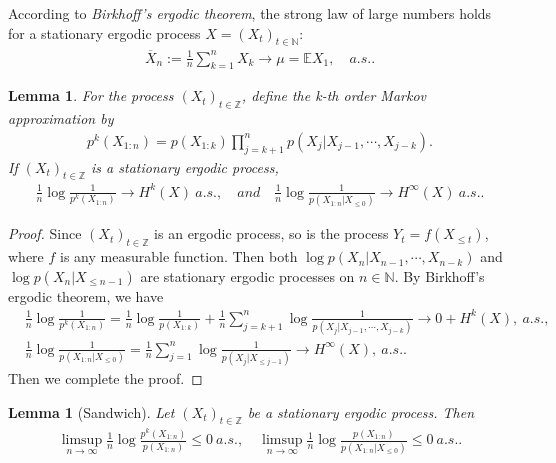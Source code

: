 \documentclass{article}
\numberwithin{equation}{section}
\newcommand{\E}{\mathbb{E}}
\newcommand{\bbN}{\mathbb{N}}
\newcommand{\bbZ}{\mathbb{Z}}
\newcommand{\ol}{\overline}
\theoremstyle{plain}
\newtheorem{lemma}[theorem]{Lemma}
\theoremstyle{definition}
\begin{document}
According to \textit{Birkhoff's ergodic theorem}, the strong law of large numbers holds for a stationary ergodic process $X=(X_t)_{t\in\bbN}$:
\begin{align*}
	\ol{X}_n:=\frac{1}{n}\sum_{k=1}^n X_k \to \mu=\E X_1,\quad a.s..
\end{align*}
\begin{lemma}\label{smblemma1}
For the process $(X_t)_{t\in\bbZ}$, define the \textit{k-th order Markov approximation by}
\begin{align*}
	p^k(X_{1:n})=p(X_{1:k})\prod_{j=k+1}^np(X_j|X_{j-1},\cdots,X_{j-k}).
\end{align*}
If $(X_t)_{t\in\bbZ}$ is a stationary ergodic process,
\begin{align*}
	\frac{1}{n}\log\frac{1}{p^k(X_{1:n})}\to H^k(X)\ a.s.,\quad and\quad \frac{1}{n}\log\frac{1}{p(X_{1:n}|X_{\leq 0})}\to H^\infty(X)\ a.s..
\end{align*}
\end{lemma}
\begin{proof}
Since $(X_t)_{t\in\bbZ}$ is an ergodic process, so is the process $Y_t=f(X_{\leq t})$, where $f$ is any measurable function. Then both $\log p(X_n|X_{n-1},\cdots,X_{n-k})$ and $\log p(X_n|X_{\leq n-1})$ are stationary ergodic processes on $n\in\bbN$. By Birkhoff's ergodic theorem, we have
\begin{align*}
	&\frac{1}{n}\log\frac{1}{p^k(X_{1:n})}=\frac{1}{n}\log\frac{1}{ p(X_{1:k})}+\frac{1}{n}\sum_{j=k+1}^n\log\frac{1}{ p(X_j|X_{j-1},\cdots,X_{j-k})}\to 0+H^k(X),\ a.s.,\\
	&\frac{1}{n}\log\frac{1}{p(X_{1:n}|X_{\leq 0})}=\frac{1}{n}\sum_{j=1}^n\log\frac{1}{p(X_j|X_{\leq j-1})}\to H^\infty(X),\ a.s..
\end{align*}
Then we complete the proof.
\end{proof}
\begin{lemma}[Sandwich]\label{smblemma2}
Let $(X_t)_{t\in\bbZ}$ be a stationary ergodic process. Then
\begin{align*}
	\limsup_{n\to\infty}\frac{1}{n}\log\frac{p^k(X_{1:n})}{p(X_{1:n})}\leq 0\ a.s.,\quad \limsup_{n\to\infty}\frac{1}{n}\log\frac{p(X_{1:n})}{p(X_{1:n}|X_{\leq 0})}\leq 0\ a.s..
\end{align*}
\end{lemma}
\end{document}
